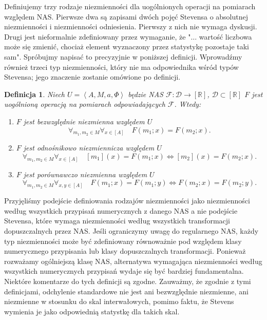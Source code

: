\documentclass[12pt,a4paper]{report}
\newtheorem{definition}{Definicja}[chapter]
\newcommand{\domkniecie}[1]{\left\lbrack{#1}\right\rbrack}
\newcommand{\tuple}[1]{\left\langle {#1} \right\rangle}
\begin{document}
Definiujemy trzy rodzaje niezmienności dla uogólnionych operacji na pomiarach względem NAS. Pierwsze dwa są zapisami dwóch pojęć Stevensa o absolutnej niezmienności i niezmienności odniesienia. Pierwszy z nich nie wymaga dyskusji. Drugi jest nieformalnie zdefiniowany przez wymaganie, że "$\dots$ wartość liczbowa może się zmienić, chociaż element wyznaczony przez statystykę pozostaje taki sam". Spróbujmy napisać to precyzyjnie w poniższej definicji. Wprowadźmy również trzeci typ niezmienności, który nie ma odpowiednika wśród typów Stevensa; jego znaczenie zostanie omówione po definicji.
\begin{definition}
Niech $U=\tuple{A,M,a,\Phi}$ będzie NAS $\mathcal{F}:\mathcal{D}\to\domkniecie{\mathbb{R}}$, $\mathcal{D}\subset \domkniecie{\mathbb{R}}$  $F$ jest uogólnioną operacją na pomiarach odpowiadających $\mathcal{F}$. Wtedy:
\begin{enumerate}
\item
$F$ jest bezwzględnie niezmienna względem $U$ 
$$
\forall_{m_{1}, m_{2} \in M}  \forall_{x \in \domkniecie{A}} \quad F(m_{1};x)=F(m_{2};x).
$$
\item
$F$ jest odnośnikowo niezmiennicza względem $U$  
$$
\forall_{m_{1}, m_{2} \in M}\forall_{x \in \domkniecie{A}} \quad \domkniecie{m_{1}}(x)=F(m_{1};x) \iff \domkniecie{m_{2}}(x)=F(m_{2};x).
$$
\item
$F$ jest porównawczo niezmienna względem $U$ 
$$
\forall_{m_1, m_2 \in M}  \forall_{x,y \in \domkniecie{A}} \quad F(m_{1};x)=F(m_{1};y) \iff F(m_{2};x)=F(m_{2};y).
$$
\end{enumerate} 
\end{definition}

Przyjęliśmy podejście definiowania rodzajów niezmienności jako niezmienności według wszystkich przypisań numerycznych z danego NAS a nie podejście Stevensa, które wymaga niezmienności według wszystkich transformacji dopuszczalnych przez NAS. Jeśli ograniczymy uwagę do regularnego NAS, każdy typ niezmienności może być zdefiniowany równoważnie pod względem klasy numerycznego przypisania lub klasy dopuszczalnych transformacji. Ponieważ rozważamy ogólniejszą klasę NAS, alternatywa wymagająca niezmienności według wszystkich numerycznych przypisań wydaje się być bardziej fundamentalna. Niektóre komentarze do tych definicji są zgodne. Zauważmy, że zgodnie z tymi definicjami, odchylenie standardowe nie jest ani bezwzględnie niezmienne, ani niezmienne w stosunku do skal interwałowych, pomimo faktu, że Stevens wymienia je jako odpowiednią statystkę dla takich skal.
\end{document}
